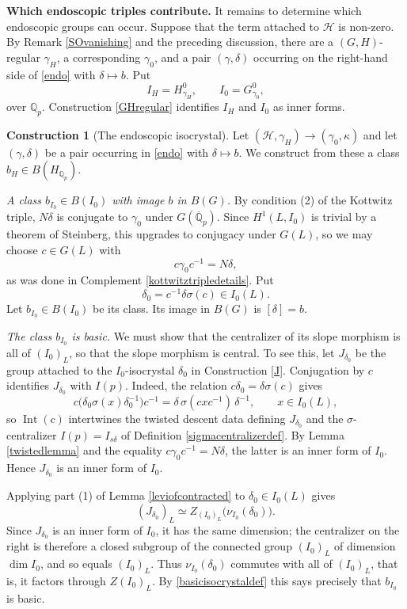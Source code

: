 \documentclass[11pt,a4paper]{article}
\theoremstyle{definition}
\newtheorem{const}[shared]{Construction}
\theoremstyle{plain}
\theoremstyle{remark}
\theoremstyle{plain}
\DeclareMathOperator{\Int}{Int}
\begin{document}
\textbf{Which endoscopic triples contribute.}
It remains to determine which endoscopic groups can occur. Suppose that the term attached to $\mathcal H$ is non-zero. By Remark \ref{SOvanishing} and the preceding discussion, there are a $(G,H)$-regular $\gamma_H$, a corresponding $\gamma_0$, and a pair $(\gamma,\delta)$ occurring on the right-hand side of \eqref{endo} with $\delta\mapsto b$. Put
$$
    I_H=H_{\gamma_H}^0,
    \qquad
    I_0=G_{\gamma_0}^0,
$$
over $\mathbb{Q}_p$. Construction \ref{GHregular} identifies $I_H$ and $I_0$ as inner forms.

\begin{const}[The endoscopic isocrystal]\label{endoscopicisocrystal}
Let $(\mathcal H,\gamma_H)\to(\gamma_0,\kappa)$ and let $(\gamma,\delta)$ be a pair occurring in \eqref{endo} with $\delta\mapsto b$. We construct from these a class $b_H\in B(H_{\mathbb{Q}_p})$.

\textit{A class $b_{I_0}\in B(I_0)$ with image $b$ in $B(G)$.} By condition (2) of the Kottwitz triple, $N\delta$ is conjugate to $\gamma_0$ under $G(\overline{\mathbb{Q}}_p)$. Since $H^1(L, I_0)$ is trivial by a theorem of Steinberg, this upgrades to conjugacy under $G(L)$, so we may choose $c \in G(L)$ with
$$
    c\gamma_0c^{-1}=N\delta,
$$
as was done in Complement \ref{kottwitztripledetails}. Put
$$
    \delta_0=c^{-1}\delta\sigma(c)\in I_0(L).
$$
Let $b_{I_0}\in B(I_0)$ be its class. Its image in $B(G)$ is $[\delta]=b$.

\textit{The class $b_{I_0}$ is basic.} We must show that the centralizer of its slope morphism is all of $(I_0)_L$, so that the slope morphism is central. To see this, let $J_{\delta_0}$ be the group attached to the $I_0$-isocrystal $\delta_0$ in Construction \ref{J}. Conjugation by $c$ identifies $J_{\delta_0}$ with $I(p)$. Indeed, the relation $c\delta_0=\delta\sigma(c)$ gives
$$
    c\bigl(\delta_0\sigma(x)\delta_0^{-1}\bigr)c^{-1}
    =\delta\,\sigma(cxc^{-1})\,\delta^{-1},
    \qquad x\in I_0(L),
$$
so $\Int(c)$ intertwines the twisted descent data defining $J_{\delta_0}$ and the $\sigma$-centralizer $I(p)=I_{s\delta}$ of Definition \ref{sigmacentralizerdef}. By Lemma \ref{twistedlemma} and the equality $c\gamma_0c^{-1}=N\delta$, the latter is an inner form of $I_0$. Hence $J_{\delta_0}$ is an inner form of $I_0$.

Applying part (1) of Lemma \ref{leviofcontracted} to $\delta_0\in I_0(L)$ gives
$$
    (J_{\delta_0})_L\simeq Z_{(I_0)_L}\bigl(\nu_{I_0}(\delta_0)\bigr).
$$
Since $J_{\delta_0}$ is an inner form of $I_0$, it has the same dimension; the centralizer on the right is therefore a closed subgroup of the connected group $(I_0)_L$ of dimension $\dim I_0$, and so equals $(I_0)_L$. Thus $\nu_{I_0}(\delta_0)$ commutes with all of $(I_0)_L$, that is, it factors through $Z(I_0)_L$. By \ref{basicisocrystaldef} this says precisely that $b_{I_0}$ is basic.


\end{const}
\end{document}

